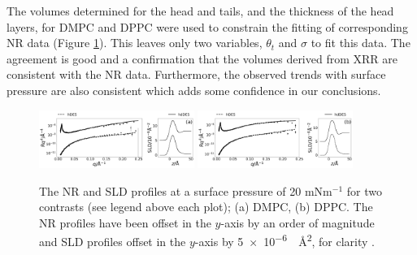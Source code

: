 \documentclass[amsmath,amssymb,twocolumn,superscriptaddress,aps,prl]{revtex4-1}
\begin{document}
The volumes determined for the head and tails, and the thickness of the head
layers, for DMPC and DPPC were used to constrain the fitting of corresponding
NR data (Figure \ref{fig:neutron}). This leaves only two variables,
$\theta_t$ and $\sigma$ to fit this data.
The agreement is good and a confirmation that the volumes derived from XRR
are consistent with the NR data.
Furthermore, the observed trends with surface pressure are also consistent
which adds some confidence in our conclusions.
%
\begin{figure}
	\centering
  \includegraphics[width=0.45\textwidth]{figures/dmpc_20n_ref_sld}
	\includegraphics[width=0.45\textwidth]{figures/dppc_20n_ref_sld}
	\caption{\small The NR and SLD profiles at a surface pressure of
  20 mNm$^{-1}$ for two contrasts (see legend above each plot); (a) DMPC,
  (b) DPPC. The NR profiles have been offset in the $y$-axis by an order of
  magnitude and SLD profiles offset in the $y$-axis by
  \SI{5e-6}{\per\square\angstrom}, for clarity \cite{SI2018}.}
	\label{fig:neutron}
\end{figure}
%
%
\end{document}
